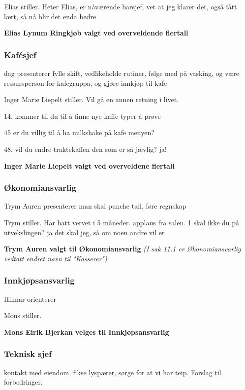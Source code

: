 \documentclass[10pt,norsk,a4paper,usenames,dvipsnames]{article}
\begin{document}
        Elias stiller. Heter Elias, er nåværende barsjef. vet at jeg klarer det, også fått lært, så nå blir det enda bedre
        
        \textbf{Elias Lynum Ringkjøb valgt ved overveldende flertall}
        
        
        \subsubsection{Kafésjef}
        dag presenterer
        fylle skift, vedlikeholde rutiner, følge med på vasking, og være ressursperson for kafegruppa, og gjøre innkjøp til kafe
        
        Inger Marie Liepelt stiller. Vil gå en annen retning i livet. 
        
        14. kommer til du til å finne nye kaffe typer å prøve
        
        45 er du villig til å ha milkshake på kafe menyen?
        
        48. vil du endre traktekaffen
        den som er så jævlig? ja!
        
        \textbf{Inger Marie Liepelt valgt ved overveldene flertall}
        
        \subsubsection{Økonomiansvarlig}
        Trym Auren presenterer
        man skal punche tall, føre regnskap
        
        Trym stiller.
        Har hatt vervet i 5 måneder. 
        applaus fra salen.
        1 skal ikke du på utvekslingen?
        ja det skal jeg, så om noen andre vil er
        
        \textbf{Trym Auren valgt til Økonomiansvarlig} \textit{(I sak 11.1 er Økonomiansvarlig vedtatt endret navn til "Kasserer")}

        
        \subsubsection{Innkjøpsansvarlig}
        Hilmar orienterer
        
        Mons stiller.
        
        \textbf{Mons Eirik Bjerkan velges til Innkjøpsansvarlig} 
        
        \subsubsection{Teknisk sjef}
        kontakt med eiendom, fikse lyspærer, sørge for at vi har teip. Forslag til forbedringer.
        
\end{document}
